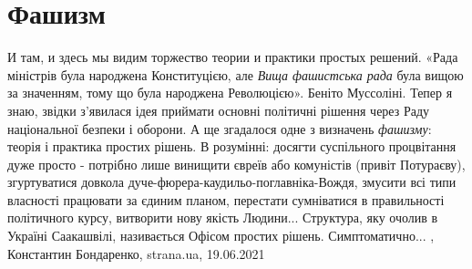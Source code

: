 
 
 
 
 
\chapter{Фашизм}
\label{sec:slova.fashizm}

И там, и здесь мы видим торжество теории и практики простых решений. «Рада
міністрів була народжена Конституцією, але \emph{Вища фашистська рада} була
вищою за значенням, тому що була народжена Революцією». Беніто Муссоліні.
Тепер я знаю, звідки з'явилася ідея приймати основні політичні рішення через
Раду національної безпеки і оборони.  А ще згадалося одне з визначень
\emph{фашизму}: теорія і практика простих рішень. В розумінні: досягти
суспільного процвітання дуже просто - потрібно лише винищити євреїв або
комуністів (привіт Потураєву), згуртуватися довкола
дуче-фюрера-каудильо-поглавніка-Вождя, змусити всі типи власності працювати за
єдиним планом, перестати сумніватися в правильності політичного курсу,
витворити нову якість Людини... Структура, яку очолив в Україні Саакашвілі,
називається Офісом простих рішень. Симптоматично...
, 
Константин Бондаренко, strana.ua, 19.06.2021

